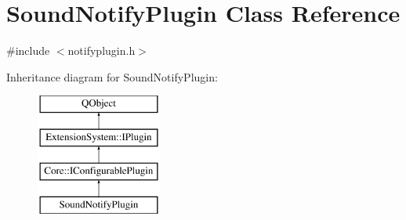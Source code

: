 \hypertarget{class_sound_notify_plugin}{\section{Sound\-Notify\-Plugin Class Reference}
\label{class_sound_notify_plugin}
}


{\ttfamily \#include $<$notifyplugin.\-h$>$}

Inheritance diagram for Sound\-Notify\-Plugin\-:\begin{figure}[H]
\begin{center}
\leavevmode
\includegraphics[height=4.000000cm]{class_sound_notify_plugin}
\end{center}
\end{figure}
